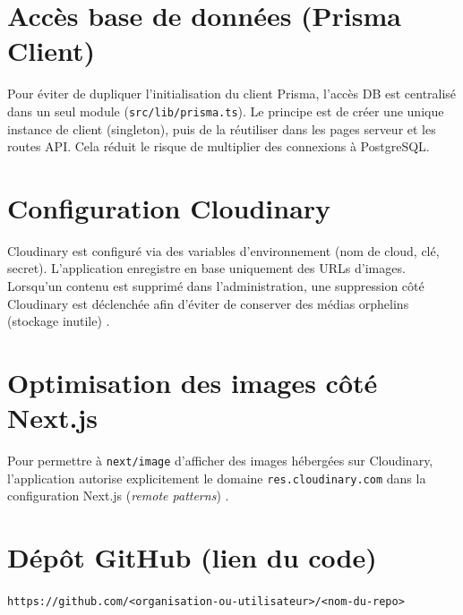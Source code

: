 \section{Accès base de données (Prisma Client)}
Pour éviter de dupliquer l’initialisation du client Prisma, l’accès DB est centralisé dans un seul module (\texttt{src/lib/prisma.ts}). Le principe est de créer une unique instance de client (singleton), puis de la réutiliser dans les pages serveur et les routes API. Cela réduit le risque de multiplier des connexions à PostgreSQL.

\section{Configuration Cloudinary}
Cloudinary est configuré via des variables d’environnement (nom de cloud, clé, secret). L’application enregistre en base uniquement des URLs d’images. Lorsqu’un contenu est supprimé dans l’administration, une suppression côté Cloudinary est déclenchée afin d’éviter de conserver des médias orphelins (stockage inutile) \cite{cloudinaryDocs}.

\section{Optimisation des images côté Next.js}
Pour permettre à \texttt{next/image} d’afficher des images hébergées sur Cloudinary, l’application autorise explicitement le domaine \texttt{res.cloudinary.com} dans la configuration Next.js (\textit{remote patterns}) \cite{nextjsDocs}.

\section{Dépôt GitHub (lien du code)}
\noindent \texttt{https://github.com/<organisation-ou-utilisateur>/<nom-du-repo>}

